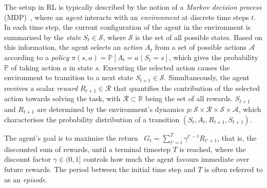 \documentclass[10pt, conference]{IEEEtran}
\begin{document}
The setup in RL is typically described by the notion of a \textit{Markov decision process} (MDP)~\cite{sutton18}, where an \emph{agent} interacts with an \emph{environment} at discrete time steps $t$.
In each time step, the current configuration of the agent in the environment is summarised by the \textit{state} $S_t \in \mathcal{S}$, where $\mathcal{S}$ is the set of all possible states.
Based on this information, the agent selects an \textit{action} $A_t$ from a set of possible actions $\mathcal{A}$ according to a \textit{policy} $\pi(s,a) = \mathbb{P}[A_t = a\mid S_t = s]$, which gives the probability $\mathbb{P}$ of taking action $a$ in state $s$.
Executing the selected action causes the environment to transition to a next state $S_{t+1} \in \mathcal{S}$.
Simultaneously, the agent receives a scalar \textit{reward} $R_{t+1} \in \mathcal{R}$ that quantifies the contribution of the selected action towards solving the task, with $\mathcal{R} \subset \mathbb{R}$ being the set of all rewards.
$S_{t+1}$ and $R_{t+1}$ are determined by the environment's dynamics $p: \mathcal{S} \times \mathcal{R} \times \mathcal{S} \times \mathcal{A}$, which characterises the probability distribution of a transition $(S_t, A_t, R_{t+1}, S_{t+1})$.

The agent's goal is to maximise the return~\cite{sutton18} $G_t = \sum_{t'=t}^T \gamma^{t'-t} R_{t'+1}$, that is, the discounted sum of rewards, until a terminal timestep $T$ is reached, where the discount factor $\gamma \in (0,1]$ controls how much the agent favours immediate over future rewards.
The period between the initial time step and $T$ is often referred to as an \emph{episode}.
\end{document}
